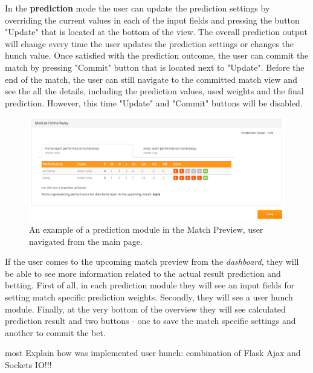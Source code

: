 In the \textbf{prediction} mode the user can update the prediction settings by overriding the current values in each of the input fields and pressing the button "Update" that is located at the bottom of the view. The overall prediction output will change every time the user updates the prediction settings or changes the hunch value. Once satisfied with the prediction outcome, the user can commit the match by pressing "Commit" button that is located next to "Update". Before the end of the match, the user can still navigate to the committed match view and see the all the details, including the prediction values, used weights and the final prediction. However, this time "Update" and "Commit" buttons will be disabled.

\begin{figure}[H]
	\begin{center}
		\includegraphics[width=.90\textwidth]{impl/images/matchoverviewex_from_main_page}
		\caption{An example of a prediction module in the Match Preview, user navigated from the main page.} \label{fig:using: matchoverviewex_from_main_page}
	\end{center}
\end{figure}

If the user comes to the upcoming match preview from the \emph{dashboard}, they will be able to see more information related to the actual result prediction and betting.
First of all, in each prediction module they will see an input fields for setting match specific prediction weights. Secondly, they will see a user hunch module. Finally, at the very bottom of the overview they will see calculated prediction result and two buttons - one to save the match specific settings and another to commit the bet.


most Explain how was implemented user hunch: combination of Flask Ajax and Sockets IO!!!
 
